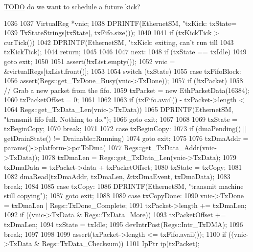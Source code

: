 \begin{Desc}
\item[\hyperlink{todo__todo000072}{TODO}]do we want to schedule a future kick? \end{Desc}



\begin{DoxyCode}
1036 {
1037     VirtualReg *vnic;
1038     DPRINTF(EthernetSM, "txKick: txState=%
1039             TxStateStrings[txState], txFifo.size());
1040 
1041     if (txKickTick > curTick()) {
1042         DPRINTF(EthernetSM, "txKick: exiting, can't run till %
1043                 txKickTick);
1044         return;
1045     }
1046 
1047   next:
1048     if (txState == txIdle)
1049         goto exit;
1050 
1051     assert(!txList.empty());
1052     vnic = &virtualRegs[txList.front()];
1053 
1054     switch (txState) {
1055       case txFifoBlock:
1056         assert(Regs::get_TxDone_Busy(vnic->TxDone));
1057         if (!txPacket) {
1058             // Grab a new packet from the fifo.
1059             txPacket = new EthPacketData(16384);
1060             txPacketOffset = 0;
1061         }
1062 
1063         if (txFifo.avail() - txPacket->length <
1064             Regs::get_TxData_Len(vnic->TxData)) {
1065             DPRINTF(EthernetSM, "transmit fifo full.  Nothing to do.\n");
1066             goto exit;
1067         }
1068 
1069         txState = txBeginCopy;
1070         break;
1071 
1072       case txBeginCopy:
1073         if (dmaPending() || getDrainState() != Drainable::Running)
1074             goto exit;
1075 
1076         txDmaAddr = params()->platform->pciToDma(
1077                 Regs::get_TxData_Addr(vnic->TxData));
1078         txDmaLen = Regs::get_TxData_Len(vnic->TxData);
1079         txDmaData = txPacket->data + txPacketOffset;
1080         txState = txCopy;
1081 
1082         dmaRead(txDmaAddr, txDmaLen, &txDmaEvent, txDmaData);
1083         break;
1084 
1085       case txCopy:
1086         DPRINTF(EthernetSM, "transmit machine still copying\n");
1087         goto exit;
1088 
1089       case txCopyDone:
1090         vnic->TxDone = txDmaLen | Regs::TxDone_Complete;
1091         txPacket->length += txDmaLen;
1092         if ((vnic->TxData & Regs::TxData_More)) {
1093             txPacketOffset += txDmaLen;
1094             txState = txIdle;
1095             devIntrPost(Regs::Intr_TxDMA);
1096             break;
1097         }
1098 
1099         assert(txPacket->length <= txFifo.avail());
1100         if ((vnic->TxData & Regs::TxData_Checksum)) {
1101             IpPtr ip(txPacket);
}}}
\end{DoxyCode}
